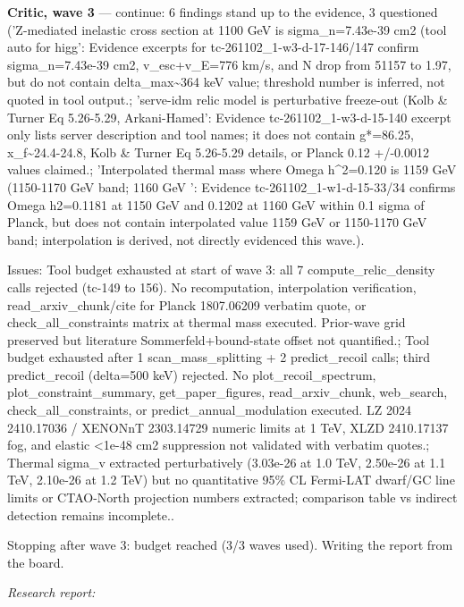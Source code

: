 \documentclass[11pt,a4paper]{article}
\begin{document}
\textbf{Critic, wave 3} --- continue: 6 findings stand up to the evidence, 3 questioned ('Z-mediated inelastic cross section at 1100 GeV is sigma\_n=7.43e-39 cm2 (tool auto for higg': Evidence excerpts for tc-261102\_1-w3-d-17-146/147 confirm sigma\_n=7.43e-39 cm2, v\_esc+v\_E=776 km/s, and N drop from 51157 to 1.97, but do not contain delta\_max\textasciitilde{}364 keV value; threshold number is inferred, not quoted in tool output.; 'serve-idm relic model is perturbative freeze-out (Kolb \& Turner Eq 5.26-5.29, Arkani-Hamed': Evidence tc-261102\_1-w3-d-15-140 excerpt only lists server description and tool names; it does not contain g*=86.25, x\_f\textasciitilde{}24.4-24.8, Kolb \& Turner Eq 5.26-5.29 details, or Planck 0.12 +/-0.0012 values claimed.; 'Interpolated thermal mass where Omega h\textasciicircum{}2=0.120 is 1159 GeV (1150-1170 GeV band; 1160 GeV ': Evidence tc-261102\_1-w1-d-15-33/34 confirms Omega h2=0.1181 at 1150 GeV and 0.1202 at 1160 GeV within 0.1 sigma of Planck, but does not contain interpolated value 1159 GeV or 1150-1170 GeV band; interpolation is derived, not directly evidenced this wave.).

Issues: Tool budget exhausted at start of wave 3: all 7 compute\_relic\_density calls rejected (tc-149 to 156). No recomputation, interpolation verification, read\_arxiv\_chunk/cite for Planck 1807.06209 verbatim quote, or check\_all\_constraints matrix at thermal mass executed. Prior-wave grid preserved but literature Sommerfeld+bound-state offset not quantified.; Tool budget exhausted after 1 scan\_mass\_splitting + 2 predict\_recoil calls; third predict\_recoil (delta=500 keV) rejected. No plot\_recoil\_spectrum, plot\_constraint\_summary, get\_paper\_figures, read\_arxiv\_chunk, web\_search, check\_all\_constraints, or predict\_annual\_modulation executed. LZ 2024 2410.17036 / XENONnT 2303.14729 numeric limits at 1 TeV, XLZD 2410.17137 fog, and elastic \textless{}1e-48 cm2 suppression not validated with verbatim quotes.; Thermal sigma\_v extracted perturbatively (3.03e-26 at 1.0 TeV, 2.50e-26 at 1.1 TeV, 2.10e-26 at 1.2 TeV) but no quantitative 95\% CL Fermi-LAT dwarf/GC line limits or CTAO-North projection numbers extracted; comparison table vs indirect detection remains incomplete..

Stopping after wave 3: budget reached (3/3 waves used). Writing the report from the board.

\textit{Research report:}\par
\end{document}
